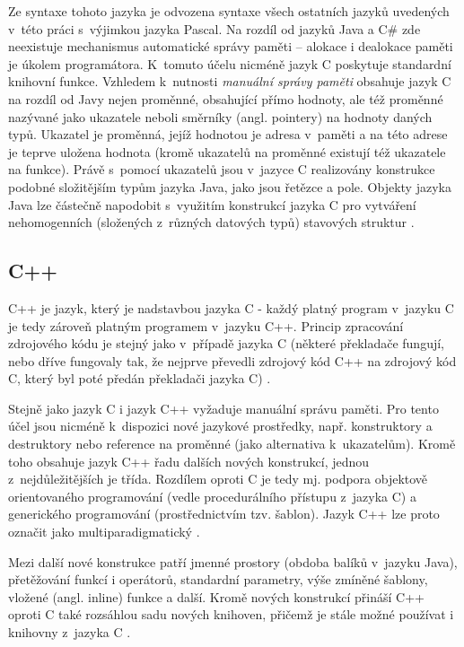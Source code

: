 \documentclass[onepage, a4paper, 12pt]{bakalarka}
\begin{document}
Ze syntaxe tohoto jazyka je odvozena syntaxe všech ostatních jazyků uvedených v~této práci s~výjimkou jazyka Pascal. Na rozdíl od jazyků Java a C\# zde neexistuje mechanismus automatické správy paměti – alokace i dealokace paměti je úkolem programátora. K~tomuto účelu nicméně jazyk C poskytuje standardní knihovní funkce. Vzhledem k~nutnosti \textit{manuální správy paměti} obsahuje jazyk C na rozdíl od Javy nejen proměnné, obsahující přímo hodnoty, ale též proměnné nazývané jako ukazatele neboli směrníky (angl. pointery) na hodnoty daných typů. Ukazatel je proměnná, jejíž hodnotou je adresa v~paměti a na této adrese je teprve uložena hodnota (kromě ukazatelů na proměnné existují též ukazatele na funkce). Právě s~pomocí ukazatelů jsou v~jazyce C realizovány konstrukce podobné složitějším typům jazyka Java, jako jsou řetězce a pole. Objekty jazyka Java lze částečně napodobit s~využitím konstrukcí jazyka C pro vytváření nehomogenních (složených z~různých datových typů) stavových struktur \cite{c-book, c-guide}.

\subsection{C++}
C++ je jazyk, který je nadstavbou jazyka C - každý platný program v~jazyku C je tedy zároveň platným programem v~jazyku C++. Princip zpracování zdrojového kódu je stejný jako v~případě jazyka C (některé překladače fungují, nebo dříve fungovaly tak, že nejprve převedli zdrojový kód C++ na zdrojový kód C, který byl poté předán překladači jazyka C) \cite{cpp-book}.\par
Stejně jako jazyk C i jazyk C++ vyžaduje manuální správu paměti. Pro tento účel jsou nicméně k~dispozici nové jazykové prostředky, např. konstruktory a destruktory nebo reference na proměnné (jako alternativa k~ukazatelům). Kromě toho obsahuje jazyk C++ řadu dalších nových konstrukcí, jednou z~nejdůležitějších je třída. Rozdílem oproti C je tedy mj. podpora objektově orientovaného programování (vedle procedurálního přístupu z~jazyka C) a generického programování (prostřednictvím tzv. šablon). Jazyk C++ lze proto označit jako multiparadigmatický \cite{cpp-book, cpp-guide-classes}.\par
Mezi další nové konstrukce patří jmenné prostory (obdoba balíků v~jazyku Java), přetěžování funkcí i operátorů, standardní parametry, výše zmíněné šablony, vložené (angl. inline) funkce a další. Kromě nových konstrukcí přináší C++ oproti C také rozsáhlou sadu nových knihoven, přičemž je stále možné používat i knihovny z~jazyka C \cite{cpp-book}.\par
\end{document}
